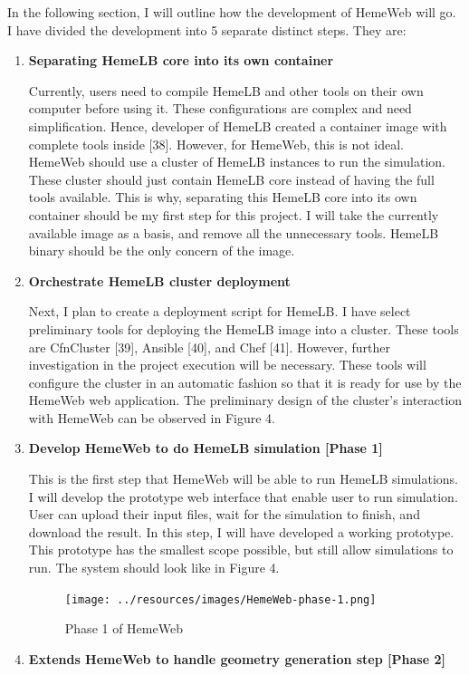 \documentclass[]{article}
\begin{document}
In the following section, I will outline how the development of HemeWeb
will go. I have divided the development into 5 separate distinct steps.
They are:

\begin{enumerate}
\def\labelenumi{\arabic{enumi}.}
\item
  \textbf{Separating HemeLB core into its own container}

  Currently, users need to compile HemeLB and other tools on their own
  computer before using it. These configurations are complex and need
  simplification. Hence, developer of HemeLB created a container image
  with complete tools inside {[}38{]}. However, for HemeWeb, this is not
  ideal. HemeWeb should use a cluster of HemeLB instances to run the
  simulation. These cluster should just contain HemeLB core instead of
  having the full tools available. This is why, separating this HemeLB
  core into its own container should be my first step for this project.
  I will take the currently available image as a basis, and remove all
  the unnecessary tools. HemeLB binary should be the only concern of the
  image.
\item
  \textbf{Orchestrate HemeLB cluster deployment}

  Next, I plan to create a deployment script for HemeLB. I have select
  preliminary tools for deploying the HemeLB image into a cluster. These
  tools are CfnCluster {[}39{]}, Ansible {[}40{]}, and Chef {[}41{]}.
  However, further investigation in the project execution will be
  necessary. These tools will configure the cluster in an automatic
  fashion so that it is ready for use by the HemeWeb web application.
  The preliminary design of the cluster's interaction with HemeWeb can
  be observed in Figure 4.
\item
  \textbf{Develop HemeWeb to do HemeLB simulation {[}Phase 1{]}}

  This is the first step that HemeWeb will be able to run HemeLB
  simulations. I will develop the prototype web interface that enable
  user to run simulation. User can upload their input files, wait for
  the simulation to finish, and download the result. In this step, I
  will have developed a working prototype. This prototype has the
  smallest scope possible, but still allow simulations to run. The
  system should look like in Figure 4.

  \begin{figure}[H]
  \centering
  \texttt{[image: ../resources/images/HemeWeb-phase-1.png]}
  \caption{Phase 1 of HemeWeb}
  \end{figure}
\item
  \textbf{Extends HemeWeb to handle geometry generation step {[}Phase
  2{]}}


\end{enumerate}
\end{document}
